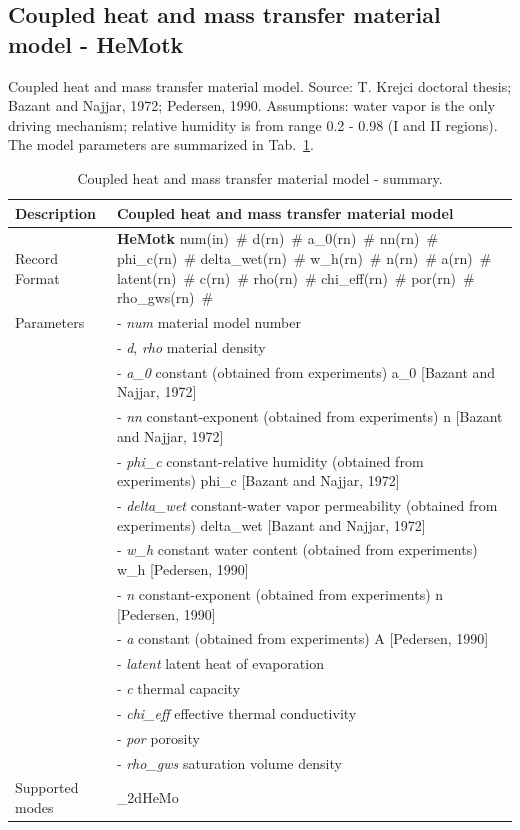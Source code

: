 \documentclass[a4paper]{article}
\newcommand{\descitem}[1]{{\noindent \bf #1}}
\newcommand{\elemparam}[2]{{{#1\tiny (#2)}~\#}}
\newcommand{\param}[1]{{\it #1}}
\newenvironment{mmt}{\begin{tabular}{|l|p{9cm}|}}{\end{tabular}\\}
\newenvironment{mmt}{\begin{tabular}{|l|l|}}{\end{tabular}\\}
\begin{document}
\subsection{Coupled heat and mass transfer material model - HeMotk}
Coupled heat and mass transfer material model.
Source: T. Krejci doctoral thesis; Bazant and Najjar, 1972;
Pedersen, 1990. Assumptions: water vapor is the only driving
mechanism; relative humidity is from range 0.2 - 0.98 (I and II
regions). The model parameters are summarized
in Tab.~\ref{hemotk_table}.
\begin{table}[!htb]
\begin{mmt}
\hline
Description & Coupled heat and mass transfer material model\\
\hline
Record Format & \descitem{HeMotk} \elemparam{num}{in}
\elemparam{d}{rn} \elemparam{a\_0}{rn} \elemparam{nn}{rn}
\elemparam{phi\_c}{rn} \elemparam{delta\_wet}{rn}
\elemparam{w\_h}{rn} \elemparam{n}{rn}
\elemparam{a}{rn} \elemparam{latent}{rn}
\elemparam{c}{rn} \elemparam{rho}{rn}
\elemparam{chi\_eff}{rn} \elemparam{por}{rn}
\elemparam{rho\_gws}{rn}\\
Parameters &- \param{num} material model number\\
&- \param{d}, \param{rho} material density\\
&- \param{a\_0} constant (obtained from experiments) a\_0 [Bazant and Najjar, 1972]\\
&- \param{nn} constant-exponent (obtained from experiments) n [Bazant
and Najjar, 1972]\\
&- \param{phi\_c} constant-relative humidity  (obtained from experiments) phi\_c [Bazant and Najjar, 1972]\\
&- \param{delta\_wet} constant-water vapor permeability (obtained from
experiments) delta\_wet [Bazant and Najjar, 1972]\\
&- \param{w\_h} constant water content (obtained from experiments) w\_h
[Pedersen, 1990]\\
&- \param{n} constant-exponent (obtained from experiments) n [Pedersen, 1990]\\
&- \param{a} constant (obtained from experiments) A [Pedersen, 1990]\\
&- \param{latent} latent heat of evaporation\\
&- \param{c} thermal capacity\\
&- \param{chi\_eff} effective thermal conductivity\\
&- \param{por} porosity\\
&- \param{rho\_gws} saturation volume density\\
Supported modes& \_2dHeMo\\
\hline
\end{mmt}
\caption{Coupled heat and mass transfer material model - summary.}
\label{hemotk_table}
\end{table}
\end{document}
